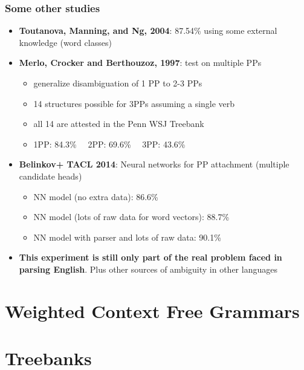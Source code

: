 \begin{frame}
\frametitle{Some other studies}
  \begin{itemize}
  \item {\bf Toutanova, Manning, and Ng, 2004}: 87.54\% using some external knowledge (word classes)
  \item {\bf Merlo, Crocker and Berthouzoz, 1997}: test on multiple PPs
  \begin{itemize}
	\item generalize disambiguation of 1 PP to 2-3 PPs
	\item 14 structures possible for 3PPs assuming a single verb
	\item all 14 are attested in the Penn WSJ Treebank
	\item 1PP: 84.3\% \ \ 2PP: 69.6\% \ \ 3PP: 43.6\% 
  \end{itemize}
  \item {\bf Belinkov+ TACL 2014}: Neural networks for PP attachment (multiple candidate heads)
  \begin{itemize}
	\item NN model (no extra data): 86.6\%
	\item NN model (lots of raw data for word vectors): 88.7\%
	\item NN model with parser and lots of raw data: 90.1\%
  \end{itemize}
  \item {\bf This experiment is still only part of the real problem faced in parsing English}. Plus other sources of ambiguity in other languages
  \end{itemize}


\end{frame}

\section{Weighted Context Free Grammars}

\section{Treebanks}

